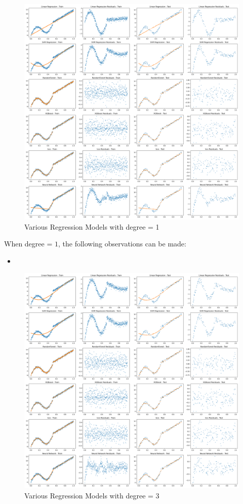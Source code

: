 \begin{figure}[H]
	\centering
	\includegraphics[width=\linewidth]{./Images/E3-MLR3-1.png}
	\caption{Various Regression Models with degree = 1}
\end{figure}

When degree = $1$, the following observations can be made:

\begin{itemize}
	\item 
\end{itemize}


\begin{figure}[H]
	\centering
	\includegraphics[width=\linewidth]{./Images/E3-MLR3-3.png}
	\caption{Various Regression Models with degree = 3}
\end{figure}

